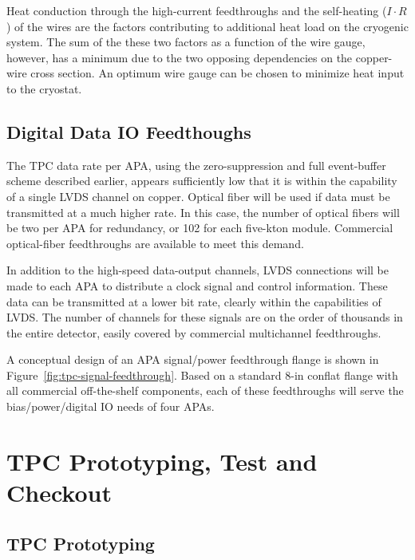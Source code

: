 Heat conduction through the high-current feedthroughs and the self-heating ($I\cdot R$) of the wires are the factors contributing to additional heat load on the cryogenic system.   The sum of the these two factors as a function of the wire gauge, however, has a minimum 
due to the two opposing dependencies on the copper-wire cross section.  An optimum wire gauge can be chosen to minimize heat input to the cryostat.

\subsection{Digital Data IO Feedthoughs}
\label{subsec:v5-tpc-feedthru-digital}

The TPC data rate per APA, using the zero-suppression and full event-buffer scheme described earlier, appears sufficiently low that it is within the capability of a single LVDS channel on copper. Optical fiber will be used if data must be transmitted at a much higher rate.  In this case, the number of optical fibers will be two per APA for redundancy, or 102 for each five-kton module. Commercial optical-fiber feedthroughs are available to meet this demand.

In addition to the high-speed data-output channels,  LVDS connections will be made to each APA to 
distribute a clock signal and control information.  These data 
can be transmitted at a lower bit rate, clearly within the
capabilities of LVDS. The number of channels for these signals 
are on the order of thousands in the entire detector, easily covered by commercial multichannel feedthroughs. 

A conceptual design of an APA signal/power feedthrough flange is shown in Figure~\ref{fig:tpc-signal-feedthrough}.  Based on a standard 8-in conflat flange with all commercial off-the-shelf components, each of these feedthroughs will serve the bias/power/digital IO needs of four APAs.  

\section{TPC Prototyping, Test and  Checkout}
\label{sec:v5-tpc-checkout}

\subsection{TPC Prototyping}
\label{sec:v5-tpc-checkout-prototype}

